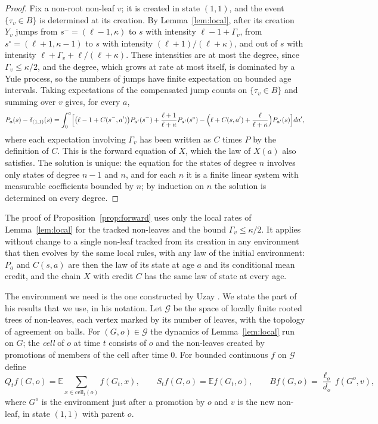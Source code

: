 \documentclass[11pt]{article}
\theoremstyle{plain}
\theoremstyle{definition}
\theoremstyle{remark}
\begin{document}
\begin{proof}
Fix a non-root non-leaf $v$; it is created in state $(1,1)$, and the event $\{\tau_v\in B\}$ is determined at its creation. By Lemma~\ref{lem:local}, after its creation $Y_v$ jumps from $s^-=(\ell-1,\kappa)$ to $s$ with intensity $\ell-1+\Gamma_v$, from $s^\circ=(\ell+1,\kappa-1)$ to $s$ with intensity $(\ell+1)/(\ell+\kappa)$, and out of $s$ with intensity $\ell+\Gamma_v+\ell/(\ell+\kappa)$. These intensities are at most the degree, since $\Gamma_v\le\kappa/2$, and the degree, which grows at rate at most itself, is dominated by a Yule process, so the numbers of jumps have finite expectation on bounded age intervals. Taking expectations of the compensated jump counts on $\{\tau_v\in B\}$ and summing over $v$ gives, for every $a$,
\[
P_a(s)-\delta_{(1,1)}(s)=\int_0^a\Bigl[\bigl(\ell-1+C(s^-,a')\bigr)P_{a'}(s^-)+\frac{\ell+1}{\ell+\kappa}P_{a'}(s^\circ)-\Bigl(\ell+C(s,a')+\frac{\ell}{\ell+\kappa}\Bigr)P_{a'}(s)\Bigr]da',
\]
where each expectation involving $\Gamma_v$ has been written as $C$ times $P$ by the definition of $C$. This is the forward equation of $X$, which the law of $X(a)$ also satisfies. The solution is unique: the equation for the states of degree $n$ involves only states of degree $n-1$ and $n$, and for each $n$ it is a finite linear system with measurable coefficients bounded by $n$; by induction on $n$ the solution is determined on every degree.
\end{proof}

The proof of Proposition~\ref{prop:forward} uses only the local rates of Lemma~\ref{lem:local} for the tracked non-leaves and the bound $\Gamma_v\le\kappa/2$. It applies without change to a single non-leaf tracked from its creation in any environment that then evolves by the same local rules, with any law of the initial environment: $P_a$ and $C(s,a)$ are then the law of its state at age $a$ and its conditional mean credit, and the chain $X$ with credit $C$ has the same law of state at every age.

The environment we need is the one constructed by Uzay \cite{UzayR3}. We state the part of his results that we use, in his notation. Let $\mathcal G$ be the space of locally finite rooted trees of non-leaves, each vertex marked by its number of leaves, with the topology of agreement on balls. For $(G,o)\in\mathcal G$ the dynamics of Lemma~\ref{lem:local} run on $G$; the \emph{cell} of $o$ at time $t$ consists of $o$ and the non-leaves created by promotions of members of the cell after time $0$. For bounded continuous $f$ on $\mathcal G$ define
\[
 Q_tf(G,o)=\mathbb E\sum_{x\in\mathrm{cell}_t(o)}f(G_t,x),\qquad S_tf(G,o)=\mathbb E f(G_t,o),\qquad Bf(G,o)=\frac{\ell_o}{d_o}\,f(G^{o},v),
\]
where $G^o$ is the environment just after a promotion by $o$ and $v$ is the new non-leaf, in state $(1,1)$ with parent $o$.
\end{document}
